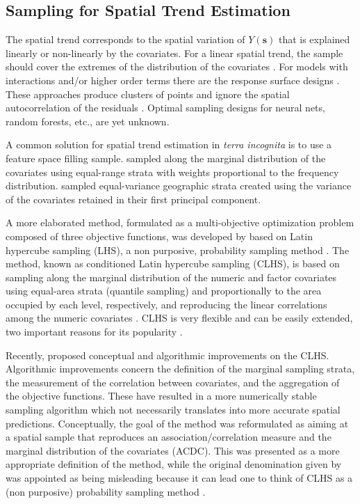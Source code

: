 \subsection{Sampling for Spatial Trend Estimation}

The spatial trend corresponds to the spatial variation of $Y(\boldsymbol{s})$ that is explained linearly or 
non-linearly by the covariates. For a linear spatial trend, the sample should cover the extremes of the 
distribution of the covariates \cite{Mueller2007}. For models with interactions and/or higher order terms there 
are the response surface designs \cite{BoxEtAl1951, LeschEtAl1995}. These approaches produce clusters of points 
and ignore the spatial autocorrelation of the residuals \cite{BrusEtAl2007a, Mueller2007}. Optimal sampling 
designs for neural nets, random forests, etc., are yet unknown.

A common solution for spatial trend estimation in \emph{terra incognita} is to use a feature space filling 
sample. \citet{HenglEtAl2003a} sampled along the marginal distribution of the covariates using equal-range 
strata with weights proportional to the frequency distribution. \citet{MinasnyEtAl2007a} sampled equal-variance 
geographic strata created using the variance of the covariates retained in their first principal component.

A more elaborated method, formulated as a multi-objective optimization problem composed of three objective 
functions, was developed by \citet{MinasnyEtAl2006b} based on Latin hypercube sampling (LHS), a non purposive, 
probability sampling method \cite{McKayEtAl1979}. The method, known as conditioned Latin hypercube sampling 
(CLHS), is based on sampling along the marginal distribution of the numeric and factor covariates using 
equal-area strata (quantile sampling) and proportionally to the area occupied by each level, respectively, and 
reproducing the linear correlations among the numeric covariates \cite{MinasnyEtAl2006b}. CLHS is very flexible 
and can be easily extended, two important reasons for its popularity \cite{MinasnyEtAl2010a, RoudierEtAl2012}.

Recently, \citet{Samuel-RosaEtAl2016} proposed conceptual and algorithmic improvements on the CLHS. Algorithmic 
improvements concern the definition of the marginal sampling strata, the measurement of the correlation between 
covariates, and the aggregation of the objective functions. These have resulted in a more numerically stable 
sampling algorithm which not necessarily translates into more accurate spatial predictions. Conceptually, the 
goal of the method was reformulated as aiming at a spatial sample that reproduces an association/correlation 
measure and the marginal distribution of the covariates (ACDC). This was presented as a more appropriate 
definition of the method, while the original denomination given by \citet{MinasnyEtAl2006b} was appointed as 
being misleading because it can lead one to think of CLHS as a (non purposive) probability sampling method 
\citet{Samuel-RosaEtAl2016}.

